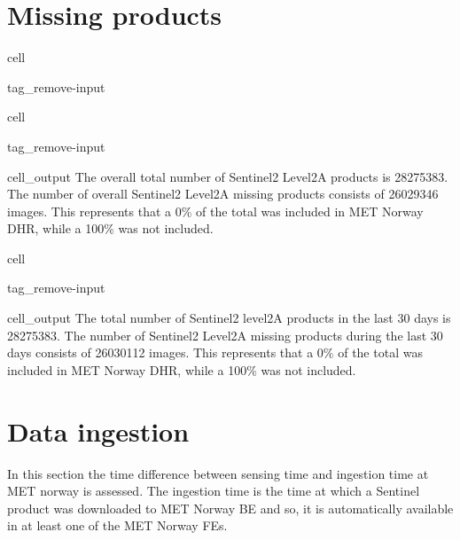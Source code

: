 \documentclass[letterpaper,10pt,english]{jupyterBook}
\begin{document}
\section{Missing products}
\label{\detokenize{S2L2A_portals:missing-products}}
\begin{sphinxuseclass}{cell}
\begin{sphinxuseclass}{tag_remove-input}
\end{sphinxuseclass}
\end{sphinxuseclass}
\begin{sphinxuseclass}{cell}
\begin{sphinxuseclass}{tag_remove-input}\begin{sphinxVerbatimOutput}

\begin{sphinxuseclass}{cell_output}
\sphinxAtStartPar
The overall total number of Sentinel\sphinxhyphen{}2 Level\sphinxhyphen{}2A products is 28275383. The number of overall Sentinel\sphinxhyphen{}2 Level\sphinxhyphen{}2A missing products consists of 26029346 images. This represents that a 0\% of the total was included in MET Norway DHR, while a 100\% was not included.

\end{sphinxuseclass}\end{sphinxVerbatimOutput}

\end{sphinxuseclass}
\end{sphinxuseclass}
\begin{sphinxuseclass}{cell}
\begin{sphinxuseclass}{tag_remove-input}\begin{sphinxVerbatimOutput}

\begin{sphinxuseclass}{cell_output}
\sphinxAtStartPar
The total number of Sentinel\sphinxhyphen{}2 level\sphinxhyphen{}2A products in the last 30 days is 28275383. The number of Sentinel\sphinxhyphen{}2 Level\sphinxhyphen{}2A missing products during the last 30 days consists of 26030112 images. This represents that a 0\% of the total was included in MET Norway DHR, while a 100\% was not included.

\end{sphinxuseclass}\end{sphinxVerbatimOutput}

\end{sphinxuseclass}
\end{sphinxuseclass}

\section{Data ingestion}
\label{\detokenize{S2L2A_portals:data-ingestion}}
\sphinxAtStartPar
In this section the time difference between sensing time and ingestion time at MET norway is assessed. The ingestion time is the time at which a Sentinel product was downloaded to MET Norway BE and so, it is automatically available in at least one of the MET Norway FEs.
\end{document}
